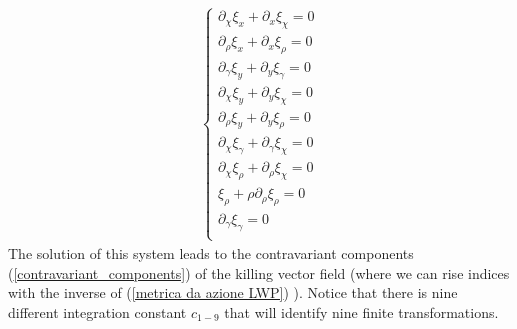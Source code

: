 \begin{equation*}
\begin{aligned}
\begin{cases}
          \displaystyle \partial_{\chi}\xi_x + \partial_x\xi_{\chi}=0 \\[0.5em]

          \displaystyle \partial_{\rho}\xi_x + \partial_x\xi_{\rho}=0 \\[0.5em]

          \displaystyle \partial_{\gamma}\xi_y + \partial_y\xi_{\gamma}=0 \\[0.5em]

          \displaystyle \partial_{\chi}\xi_y + \partial_y\xi_{\chi}=0 \\[0.5em]

          \displaystyle \partial_{\rho}\xi_y + \partial_y\xi_{\rho}=0 \\[0.5em]

          \displaystyle \partial_{\chi}\xi_{\gamma} + \partial_{\gamma}\xi_{\chi}=0 \\[0.5em]

          \displaystyle \partial_{\chi}\xi_{\rho} + \partial_{\rho}\xi_{\chi}=0 \\[0.5em]

          \xi_{\rho}+\rho\partial_{\rho}\xi_{\rho}=0 \\[0.5em]

          \displaystyle \partial_{\gamma}\xi_{\gamma} =0 \\[0.5em]
        \end{cases}
    \end{aligned}
\end{equation*}
The solution of this system leads to the contravariant components (\ref{contravariant_components}) of the killing vector field (where we can rise indices with the inverse of (\ref{metrica da azione LWP}) ). Notice that there is nine different integration constant $c_{1-9}$ that will identify nine finite transformations.

